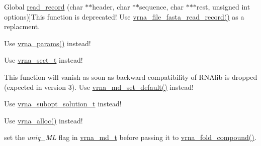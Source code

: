 \begin{DoxyRefList}
%
Global \hyperlink{group__file__formats_gafd194a69af9d92b5b0412a7627ac1595}{read\+\_\+record} (char $\ast$$\ast$header, char $\ast$$\ast$sequence, char $\ast$$\ast$$\ast$rest, unsigned int options)]This function is deprecated! Use \hyperlink{group__file__formats_ga8cfb7e271efc9e1f34640acb85475639}{vrna\+\_\+file\+\_\+fasta\+\_\+read\+\_\+record()} as a replacment. 
\item[\label{deprecated__deprecated000144}%
\Hypertarget{deprecated__deprecated000144}%
Global \hyperlink{group__energy__parameters_ga541f2cf7436e9bc939b0a49b24baf987}{scale\+\_\+parameters} (void)]Use \hyperlink{group__energy__parameters_gad0e3e7e74bdc50d1709d40c92993185e}{vrna\+\_\+params()} instead! 
\item[\label{deprecated__deprecated000200}%
\Hypertarget{deprecated__deprecated000200}%
Global \hyperlink{group__data__structures_gaaacedee1f05d3d45aa6764eca51a8876}{sect} ]Use \hyperlink{group__data__structures_gacc9cdae790dac75a7024e7069c0d4400}{vrna\+\_\+sect\+\_\+t} instead!  
\item[\label{deprecated__deprecated000090}%
\Hypertarget{deprecated__deprecated000090}%
Global \hyperlink{group__model__details_gabad896c3650d420f3f3ddefc69e2bceb}{set\+\_\+model\+\_\+details} (vrna\+\_\+md\+\_\+t $\ast$md)]This function will vanish as soon as backward compatibility of R\+N\+Alib is dropped (expected in version 3). Use \hyperlink{group__model__details_ga8ac6ff84936282436f822644bf841f66}{vrna\+\_\+md\+\_\+set\+\_\+default()} instead! 
\item[\label{deprecated__deprecated000132}%
\Hypertarget{deprecated__deprecated000132}%
Global \hyperlink{subopt_8h_aa0f46ff02e1017469cf902d02ecd7f9a}{S\+O\+L\+U\+T\+I\+ON} ]Use \hyperlink{subopt_8h_a01ae9a0f27d245d89f705afd843fc457}{vrna\+\_\+subopt\+\_\+solution\+\_\+t} instead!  
\item[\label{deprecated__deprecated000170}%
\Hypertarget{deprecated__deprecated000170}%
Global \hyperlink{utils_2basic_8h_ad7e1e137b3bf1f7108933d302a7f0177}{space} (unsigned size)]Use \hyperlink{group__utils_gaf37a0979367c977edfb9da6614eebe99}{vrna\+\_\+alloc()} instead!  
\item[\label{deprecated__deprecated000094}%
\Hypertarget{deprecated__deprecated000094}%
Global \hyperlink{group__subopt__stochbt_gacd79b1a570e6ad9be24cb11fe8cae30a}{st\+\_\+back} ]set the {\itshape uniq\+\_\+\+ML} flag in \hyperlink{group__model__details_ga1f8a10e12a0a1915f2a4eff0b28ea17c}{vrna\+\_\+md\+\_\+t} before passing it to \hyperlink{group__fold__compound_ga6601d994ba32b11511b36f68b08403be}{vrna\+\_\+fold\+\_\+compound()}. 

\end{DoxyRefList}
